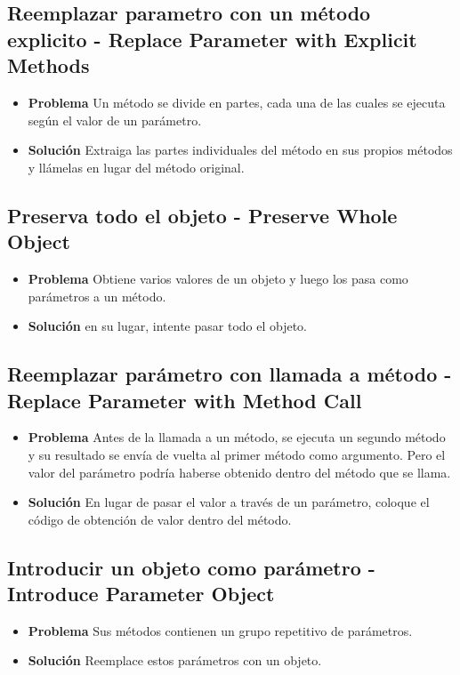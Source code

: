 \documentclass[11pt,a4paper,oneside]{book}
\begin{document}
\subsection{Reemplazar parametro con un método explicito - Replace Parameter with Explicit Methods}
\label{reemplazarparametrometodoexplicito}
\begin{itemize}
    \item \textbf{Problema} Un método se divide en partes, cada una de las cuales se ejecuta según el valor de un parámetro.
    \item \textbf{Solución} Extraiga las partes individuales del método en sus propios métodos y llámelas en lugar del método original.
\end{itemize}

\subsection{Preserva todo el objeto - Preserve Whole Object}
\label{preservatodoelobjeto}
\begin{itemize}
    \item \textbf{Problema} Obtiene varios valores de un objeto y luego los pasa como parámetros a un método.
    \item \textbf{Solución} en su lugar, intente pasar todo el objeto.
\end{itemize}
    


\subsection{Reemplazar parámetro con llamada a método - Replace Parameter with Method Call}
\label{reemplazarparametrollamadametodo}
\begin{itemize}
    \item \textbf{Problema} Antes de la llamada a un método, se ejecuta un segundo método y su resultado se envía de vuelta al primer método como argumento. Pero el valor del parámetro podría haberse obtenido dentro del método que se llama.
    \item \textbf{Solución} En lugar de pasar el valor a través de un parámetro, coloque el código de obtención de valor dentro del método.
\end{itemize}



\subsection{Introducir un objeto como parámetro - Introduce Parameter Object}
\label{introduceobjetoparametro}
\begin{itemize}
    \item \textbf{Problema} Sus métodos contienen un grupo repetitivo de parámetros.   
   \item \textbf{Solución} Reemplace estos parámetros con un objeto.
\end{itemize}
\end{document}

